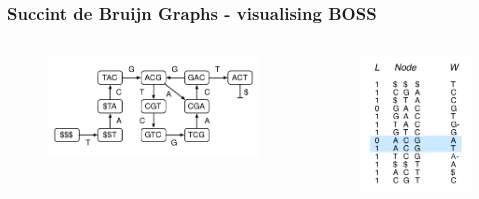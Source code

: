 \begin{frame}
\frametitle{Succint de Bruijn Graphs - visualising BOSS}
\begin{columns}
	\begin{figure}
		\includegraphics[scale=0.4]{img/sdbg-graph-padded.png}
	\end{figure}
	\begin{figure}
		\includegraphics[scale=0.5]{img/sdbg-arrays-1.png}
	\end{figure}
\end{columns}
\end{frame}

